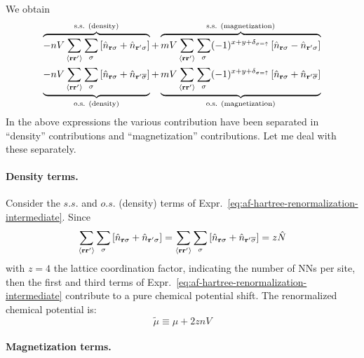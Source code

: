 We obtain
\begin{multline}
	\overbrace{
		-nV \sum_{\ev{\mathbf{r}\mathbf{r}'}} \sum_\sigma \left[
			\hat n_{\mathbf{r}\sigma} + \hat n_{\mathbf{r}'\sigma}
		\right]
	}^{\text{s.s. (density)}} + \overbrace{
		mV \sum_{\ev{\mathbf{r}\mathbf{r}'}} \sum_\sigma (-1)^{x+y+\delta_{\sigma=\uparrow}} \left[
			\hat n_{\mathbf{r}\sigma} - \hat n_{\mathbf{r}'\sigma}
		\right]
	}^{\text{s.s. (magnetization)}} \\
	\underbrace{
		-nV \sum_{\ev{\mathbf{r}\mathbf{r}'}} \sum_\sigma \left[
			\hat n_{\mathbf{r}\sigma} + \hat n_{\mathbf{r}'\overline{\sigma}}
		\right]
	}_{\text{o.s. (density)}} + \underbrace{
		mV \sum_{\ev{\mathbf{r}\mathbf{r}'}} \sum_\sigma (-1)^{x+y+\delta_{\sigma=\uparrow}} \left[
			\hat n_{\mathbf{r}\sigma} + \hat n_{\mathbf{r}'\overline{\sigma}}
		\right]
	}_{\text{o.s. (magnetization)}}
	\label{eq:af-hartree-renormalization-intermediate}
\end{multline}
In the above expressions the various contribution have been separated in ``density'' contributions and ``magnetization'' contributions. Let me deal with these separately.

\paragraph{Density terms.}

Consider the $s.s.$ and $o.s.$ (density) terms of Expr.~\eqref{eq:af-hartree-renormalization-intermediate}. Since
\[
	\sum_{\ev{\mathbf{r}\mathbf{r}'}} \sum_\sigma \left[
		\hat n_{\mathbf{r}\sigma} + \hat n_{\mathbf{r}'\sigma}
	\right] = \sum_{\ev{\mathbf{r}\mathbf{r}'}} \sum_\sigma \left[
		\hat n_{\mathbf{r}\sigma} + \hat n_{\mathbf{r}'\overline{\sigma}}
	\right] = z \hat N
\]
with $z=4$ the lattice coordination factor, indicating the number of NNs per site, then the first and third terms of Expr.~\eqref{eq:af-hartree-renormalization-intermediate} contribute to a pure chemical potential shift. The renormalized chemical potential is:
\begin{equation}\label{eq:af-hartree-chemical-potential-renormalization}
	\tilde{\mu} \equiv \mu + 2znV
\end{equation}

\paragraph{Magnetization terms.}

